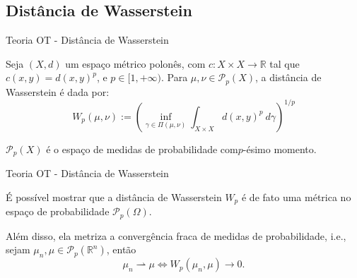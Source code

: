 \documentclass[10pt]{beamer}
\begin{document}
\subsection{Distância de Wasserstein}
\begin{frame}[fragile]{Teoria OT - Distância de Wasserstein}

\begin{definition}

  Seja $(X,d)$ um espaço métrico polonês, com $c:X \times X \to \mathbb R$ tal que $c(x,y)=d(x,y)^p$, e
  $p \in [1,+\infty)$.
  Para $\mu,\nu \in \mathcal P_p(X)$, a distância de Wasserstein é dada por:
  \begin{equation}
    W_p(\mu,\nu) :=
    \left(
    \inf_{\gamma \in \Pi(\mu,\nu)}
    \int_{X \times X} d(x,y)^p \ d\gamma
    \right)^{1/p}
    \label{def:Wasserstein}
  \end{equation}
\end{definition}

$\mathcal P_p(X)$ é o espaço de medidas de probabilidade com$p$-ésimo momento.

\end{frame}

\begin{frame}[fragile]{Teoria OT - Distância de Wasserstein}

	É possível mostrar que a distância de Wasserstein $W_p$ é de fato uma métrica
	no espaço de probabilidade $\mathcal P_p(\Omega)$.

	Além disso, ela metriza a convergência fraca de medidas de probabilidade,
	i.e., sejam $\mu_n, \mu \in \mathcal P_p(\mathbb R^n)$, então
	\begin{equation}
		\mu_n \rightharpoonup \mu \iff W_p(\mu_n, \mu) \to 0.
	\end{equation}

\end{frame}
\end{document}
